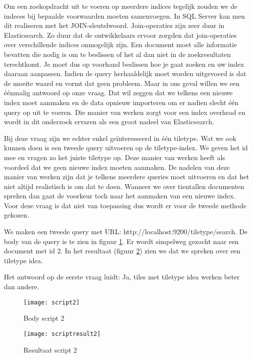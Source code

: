 Om een zoekopdracht uit te voeren op meerdere indices tegelijk zouden we de indeces bij bepaalde voorwaarden moeten samenvoegen. In SQL Server kan men dit realiseren met het JOIN-sleutelwoord. Join-operaties zijn zeer duur in Elasticsearch. Zo duur dat de ontwikkelaars ervoor zorgden dat join-operaties over verschillende indices onmogelijk zijn. Een document moet alle informatie bevatten die nodig is om te beslissen of het al dan niet in de zoekresultaten terechtkomt. Je moet dus op voorhand beslissen hoe je gaat zoeken en uw index daaraan aanpassen. Indien de query herhaaldelijk moet worden uitgevoerd is dat de moeite waard en vormt dat geen probleem. Maar in ons geval willen we een éénmalig antwoord op onze vraag. Dat wil zeggen dat we telkens een nieuwe index moet aanmaken en de data opnieuw importeren om er nadien slecht één query op uit te voeren. Die manier van werken zorgt voor een index overhead en wordt in dit onderzoek ervaren als een groot nadeel van Elasticsearch.

Bij deze vraag zijn we echter enkel geïnteresseerd in één tiletype. Wat we ook kunnen doen is een tweede query uitvoeren op de tiletype-index. We geven het id mee en vragen zo het juiste tiletype op. Deze manier van werken heeft als voordeel dat we geen nieuwe index moeten aanmaken. De nadelen van deze manier van werken zijn dat je telkens meerdere queries moet uitvoeren en dat het niet altijd realistisch is om dat te doen. Wanneer we over tientallen documenten spreken dan gaat de voorkeur toch naar het aanmaken van een nieuwe index. Voor deze vraag is dat niet van toepassing dus wordt er voor de tweede methode gekozen.

We maken een tweede query met URL: http://localhost:9200/tiletype/\textunderscore search. De body van de query is te zien in figuur \ref{fig:script2}. Er wordt simpelweg gezocht naar een document met id 2. In het resultaat (figuur \ref{fig:scriptresult2}) zien we dat we spreken over een tiletype idea.

Het antwoord op de eerste vraag luidt: Ja, tiles met tiletype idea werken beter dan andere.

\begin{figure}
	\centering
	\texttt{[image: script2]}
	\caption{Body script 2}
	\label{fig:script2}
\end{figure}

\begin{figure}
	\centering
	\texttt{[image: scriptresult2]}
	\caption{Resultaat script 2}
	\label{fig:scriptresult2}
\end{figure}


